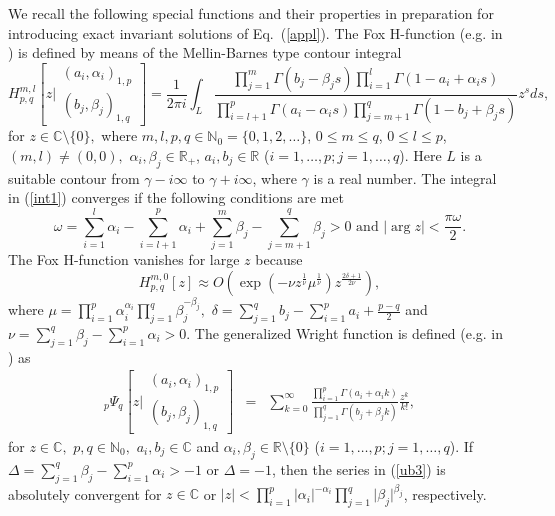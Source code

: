 \documentclass[12pt]{article}
\theoremstyle{definition}
\begin{document}
We recall the following special functions and their properties in preparation for introducing exact invariant solutions of Eq.~(\ref{appl}).
The Fox H-function (e.g. in \cite{kilb2005,Hnom1,Hnom2}) is defined by means of the Mellin-Barnes type contour integral 
\begin{equation}
\label{int1}
H_{p,q}^{m,l}\left[z\biggr\vert\begin{array}{c}
(a_i, \alpha_i)_{1,p}\\
(b_j, \beta_j)_{1,q}
\end{array}\right]=\frac{1}{2\pi i}\int_{L}\frac{\prod\limits_{j=1}^m\Gamma(b_j-\beta_js)\prod\limits_{i=1}^l\Gamma(1-a_i+\alpha_is)}{\prod\limits_{i=l+1}^p\Gamma(a_i-\alpha_is)\prod\limits_{j=m+1}^q\Gamma(1-b_j+\beta_js)}z^{s}d s,
\end{equation}
for $z\in\mathbb{C}\setminus\{0\},$ where $m,l,p,q\in\mathbb{N}_0=\{0,1,2,\ldots\}$, $0\le m \le q$, $0\le l\le p$, $(m,l)\neq (0,0),$ $\alpha_i, \beta_j\in\mathbb{R}_+$, $a_i,b_j\in\mathbb{R}$ ($i=1,\ldots, p;j=1,\ldots,q$). Here $L$ is a suitable contour from $\gamma-i\infty$ to $\gamma+i\infty$, where $\gamma$ is a real number. The integral in (\ref{int1}) converges if the following conditions are met 
\begin{equation*}
\omega=\sum_{i=1}^{l}\alpha_i-\sum_{i=l+1}^{p}\alpha_i+\sum_{j=1}^{m}\beta_j-\sum_{j=m+1}^{q}\beta_j>0\mbox{ and } \lvert\arg z\rvert<\frac{\pi\omega}{2}. 
\end{equation*}
The Fox H-function vanishes for large $z$ because 
\begin{equation*}
\label{eq8}
H_{p,q}^{m,0}[z]\approx O\left(\exp\left(-\nu z^{\frac{1}{\nu}}\mu^{\frac{1}{\nu}}\right)z^{\frac{2\delta+1}{2\nu}}\right),
\end{equation*}
where $\mu=\prod\limits_{i=1}^p\alpha_i^{\alpha_i}\prod\limits_{j=1}^q\beta_j^{-\beta_j},$ $\delta=\sum\limits_{j=1}^q b_j-\sum\limits_{i=1}^p a_i+\frac{p-q}{2}$  and
$\nu=\sum\limits_{j=1}^{q}\beta_j-\sum\limits_{i=1}^{p}\alpha_i>0$. 
The generalized Wright function is defined (e.g. in \cite{kilb2005}) as
\begin{eqnarray}
\label{ub3}
{}_p\Psi_q\left[z\biggr\vert\begin{array}{c}
(a_i,\alpha_i)_{1,p}\\
(b_j,\beta_j)_{1,q}
\end{array}\right] & = & \sum_{k=0}^\infty\frac{\prod\limits_{i=1}^p\Gamma(a_i+\alpha_i k)}{\prod\limits_{j=1}^q\Gamma(b_j+\beta_j k)}\frac{z^k}{k!},
\end{eqnarray}
for $z\in\mathbb{C},$ $p,q\in\mathbb{N}_0,$ $a_i,b_j\in\mathbb{C}$ and $\alpha_i, \beta_j\in\mathbb{R}\setminus\{0\}$ ($i=1,\ldots,p; j=1,\ldots,q$). 
If $\Delta=\sum\limits_{j=1}^q \beta_j-\sum\limits_{i=1}^p \alpha_i>-1$ or $\Delta=-1$, then the series in (\ref{ub3}) is absolutely convergent for $z\in \mathbb{C}$ or $\lvert z\rvert<\prod\limits_{i=1}^p\lvert\alpha_i\rvert^{-\alpha_i}\prod\limits_{j=1}^q\lvert\beta_j\rvert^{\beta_j}$, respectively.
\end{document}
